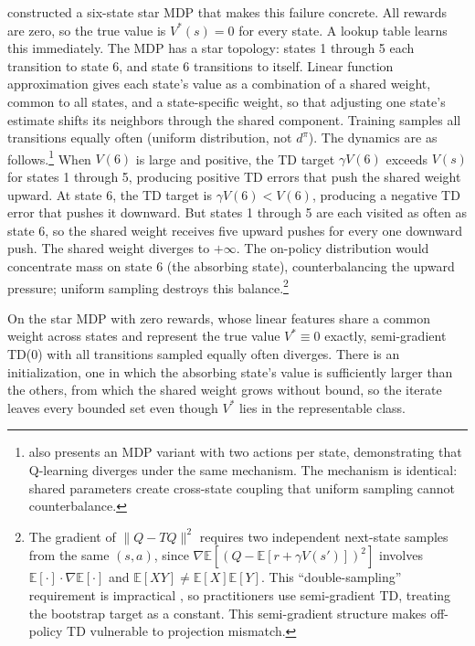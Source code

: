 \citet{Baird1995} constructed a six-state star MDP that makes this failure concrete. All rewards are zero, so the true value is $V^*(s) = 0$ for every state. A lookup table learns this immediately. The MDP has a star topology: states 1 through 5 each transition to state 6, and state 6 transitions to itself. Linear function approximation gives each state's value as a combination of a shared weight, common to all states, and a state-specific weight, so that adjusting one state's estimate shifts its neighbors through the shared component. Training samples all transitions equally often (uniform distribution, not $d^\pi$). The dynamics are as follows.\footnote{\citet{Baird1995} also presents an MDP variant with two actions per state, demonstrating that Q-learning diverges under the same mechanism. The mechanism is identical: shared parameters create cross-state coupling that uniform sampling cannot counterbalance.} When $V(6)$ is large and positive, the TD target $\gamma V(6)$ exceeds $V(s)$ for states 1 through 5, producing positive TD errors that push the shared weight upward. At state 6, the TD target is $\gamma V(6) < V(6)$, producing a negative TD error that pushes it downward. But states 1 through 5 are each visited as often as state 6, so the shared weight receives five upward pushes for every one downward push. The shared weight diverges to $+\infty$. The on-policy distribution would concentrate mass on state 6 (the absorbing state), counterbalancing the upward pressure; uniform sampling destroys this balance.\footnote{The gradient of $\|Q - TQ\|^2$ requires two independent next-state samples from the same $(s,a)$, since $\nabla\mathbb{E}[(Q - \mathbb{E}[r + \gamma V(s')])^2]$ involves $\mathbb{E}[\cdot] \cdot \nabla\mathbb{E}[\cdot]$ and $\mathbb{E}[XY] \neq \mathbb{E}[X]\mathbb{E}[Y]$. This ``double-sampling'' requirement is impractical \citep{Baird1995}, so practitioners use semi-gradient TD, treating the bootstrap target as a constant. This semi-gradient structure makes off-policy TD vulnerable to projection mismatch.}

\begin{theorem}
\label{thm:baird}
On the star MDP with zero rewards, whose linear features share a common weight across states and represent the true value $V^* \equiv 0$ exactly, semi-gradient TD(0) with all transitions sampled equally often diverges. There is an initialization, one in which the absorbing state's value is sufficiently larger than the others, from which the shared weight grows without bound, so the iterate leaves every bounded set even though $V^*$ lies in the representable class.
\end{theorem}

